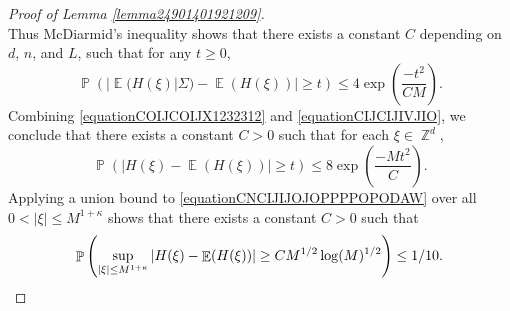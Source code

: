 \documentclass[dvipsnames,letterpaper,12pt]{article}
\numberwithin{equation}{section}
\DeclareMathOperator{\ZZ}{\mathbb{Z}}
\numberwithin{theorem}{section}
\DeclareMathOperator{\EE}{\mathbb{E}}
\DeclareMathOperator{\PP}{\mathbb{P}}
\begin{document}
\begin{proof}[Proof of Lemma \ref{lemma24901401921209}]
\begin{equation}
    \end{equation}
    Thus McDiarmid's inequality shows that there exists a constant $C$ depending on $d$, $n$, and $L$, such that for any $t \geq 0$,
    \begin{equation} \label{equationCIJCIJIVJIO}
        \PP \left( |\EE(H(\xi)|\Sigma) - \EE(H(\xi))| \geq t \right) \leq 4 \exp \left( \frac{-t^2}{C M} \right).
    \end{equation}
    Combining \eqref{equationCOIJCOIJX1232312} and \eqref{equationCIJCIJIVJIO}, we conclude that there exists a constant $C > 0$ such that for each $\xi \in \ZZ^d$,
    \begin{equation} \label{equationCNCIJIJOJOPPPPOPODAW}
        \PP \left( | H(\xi) - \EE(H(\xi)) | \geq t  \right) \leq 8 \exp \left( \frac{-M t^2}{C} \right).
    \end{equation}
    Applying a union bound to \eqref{equationCNCIJIJOJOPPPPOPODAW} over all $0 < |\xi| \leq M^{1 + \kappa}$ shows that there exists a constant $C > 0$ such that
    \[ \PP \left( \sup_{|\xi| \leq M^{1 + \kappa}} | H(\xi) - \EE(H(\xi)) | \geq C M^{1/2} \log(M)^{1/2} \right) \leq 1/10. \qedhere \]
\end{proof}
\end{document}
